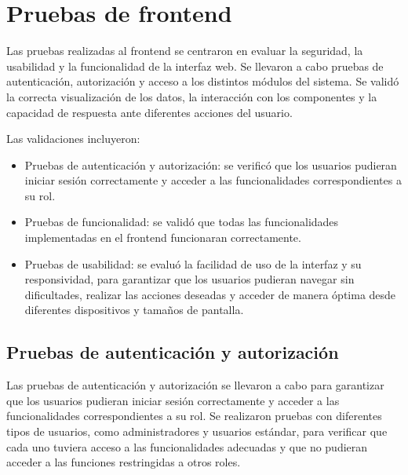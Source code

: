 
\section{Pruebas de frontend}
\label{sec:pruebas_frontend}

Las pruebas realizadas al frontend se centraron en evaluar la seguridad, la
usabilidad y la funcionalidad de la interfaz web. Se llevaron a cabo pruebas de
autenticación, autorización y acceso a los distintos módulos del sistema. Se
validó la correcta visualización de los datos, la interacción con los
componentes y la capacidad de respuesta ante diferentes acciones del usuario.

Las validaciones incluyeron:

\begin{itemize}
    \item Pruebas de autenticación y autorización: se verificó que los usuarios pudieran
          iniciar sesión correctamente y acceder a las funcionalidades correspondientes a
          su rol.
    \item Pruebas de funcionalidad: se validó que todas las funcionalidades implementadas
          en el frontend funcionaran correctamente.
    \item Pruebas de usabilidad: se evaluó la facilidad de uso de la interfaz y su
          responsividad, para garantizar que los usuarios pudieran navegar sin
          dificultades, realizar las acciones deseadas y acceder de manera óptima desde
          diferentes dispositivos y tamaños de pantalla.
\end{itemize}

\subsection{Pruebas de autenticación y autorización}

Las pruebas de autenticación y autorización se llevaron a cabo para garantizar
que los usuarios pudieran iniciar sesión correctamente y acceder a las
funcionalidades correspondientes a su rol. Se realizaron pruebas con diferentes
tipos de usuarios, como administradores y usuarios estándar, para verificar que
cada uno tuviera acceso a las funcionalidades adecuadas y que no pudieran
acceder a las funciones restringidas a otros roles.


